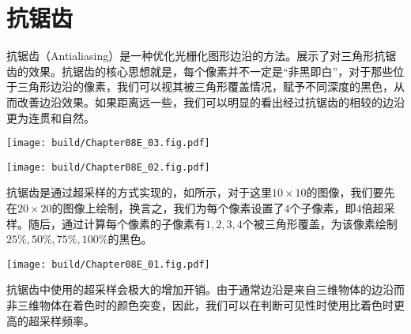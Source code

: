 \section{抗锯齿}
抗锯齿（Antialiasing）是一种优化光栅化图形边沿的方法。展示了对三角形抗锯齿的效果。抗锯齿的核心思想就是，每个像素并不一定是“非黑即白”，对于那些位于三角形边沿的像素，我们可以视其被三角形覆盖情况，赋予不同深度的黑色，从而改善边沿效果。如果距离远一些，我们可以明显的看出经过抗锯齿的相较的边沿更为连贯和自然。


\begin{Figure}[抗锯齿的效果对比]
    \begin{FigureSub}[抗锯齿前]
        \texttt{[image: build/Chapter08E\_03.fig.pdf]}
    \end{FigureSub}
    \begin{FigureSub}[抗锯齿后]
        \texttt{[image: build/Chapter08E\_02.fig.pdf]}
    \end{FigureSub}
\end{Figure}

抗锯齿是通过超采样的方式实现的，如所示，对于这里$10\times 10$的图像，我们要先在$20\times 20$的图像上绘制，换言之，我们为每个像素设置了$4$个子像素，即$4$倍超采样。随后，通过计算每个像素的子像素有$1,2,3,4$个被三角形覆盖，为该像素绘制$25\%,50\%,75\%,100\%$的黑色。

\begin{Figure}[抗锯齿与超采样]
    \texttt{[image: build/Chapter08E\_01.fig.pdf]}
\end{Figure}

抗锯齿中使用的超采样会极大的增加开销。由于通常边沿是来自三维物体的边沿而非三维物体在着色时的颜色突变，因此，我们可以在判断可见性时使用比着色时更高的超采样频率。
